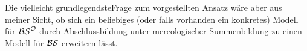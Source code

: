     Die
    vielleicht grundlegendsteFrage zum vorgestellten Ansatz wäre aber aus meiner Sicht,
    ob sich ein beliebiges (oder falls vorhanden ein konkretes) Modell für $\mathcal{BS}^{\mathcal{O}}$ durch Abschlussbildung unter mereologischer Summenbildung zu einen Modell für $\mathcal{BS}$ erweitern lässt.
% 
% 
% 
%     
%              
%         
% 
%     
%     
%     
%     
%     
%     
%     
